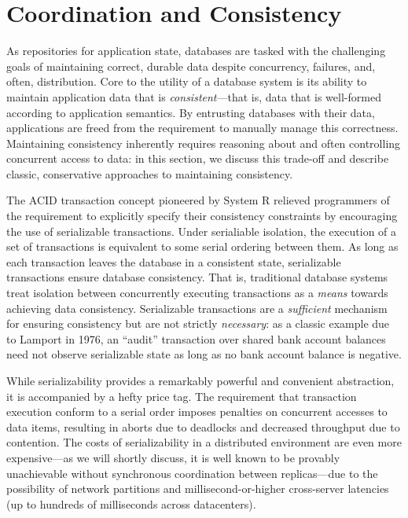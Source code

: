 
\section{Coordination and Consistency}
\label{sec:motivation}


As repositories for application state, databases are tasked with the
challenging goals of maintaining correct, durable data despite
concurrency, failures, and, often, distribution. Core to the utility
of a database system is its ability to maintain application data that
is \textit{consistent}---that is, data that is well-formed according
to application semantics. By entrusting databases with their data,
applications are freed from the requirement to manually manage this
correctness. Maintaining consistency inherently requires reasoning
about and often controlling concurrent access to data: in this
section, we discuss this trade-off and describe classic, conservative
approaches to maintaining consistency.


 The ACID transaction concept
pioneered by System R relieved programmers of the requirement to
explicitly specify their consistency constraints by encouraging the
use of serializable transactions. Under serialiable isolation, the
execution of a set of transactions is equivalent to some serial
ordering between them. As long as each transaction leaves the database
in a consistent state, serializable transactions ensure database
consistency. That is, traditional database systems treat isolation
between concurrently executing transactions as a \textit{means}
towards achieving data consistency. Serializable transactions are a
\textit{sufficient} mechanism for ensuring consistency but are not
strictly \textit{necessary}: as a classic example due to Lamport in
1976, an ``audit'' transaction over shared bank account balances need
not observe serializable state as long as no bank account balance is
negative.


While serializability provides a remarkably powerful and convenient
abstraction, it is accompanied by a hefty price tag. The requirement
that transaction execution conform to a serial order imposes penalties
on concurrent accesses to data items, resulting in aborts due to
deadlocks and decreased throughput due to contention. The costs of
serializability in a distributed environment are even more
expensive---as we will shortly discuss, it is well known to be
provably unachievable without synchronous coordination between
replicas---due to the possibility of network partitions and
millisecond-or-higher cross-server latencies (up to hundreds of
milliseconds across datacenters).

